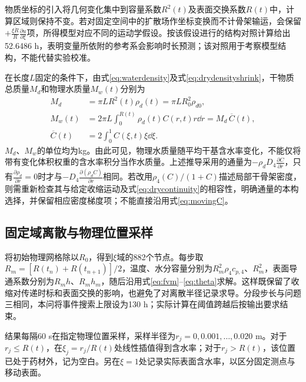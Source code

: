 物质坐标的引入将几何变化集中到容量系数$R^2(t)$及表面交换系数$R(t)$中，计算区域则保持不变。若对固定空间中的扩散场作坐标变换而不计骨架输运，会保留$+\frac{\xi\dot R}{R}\frac{\partial u}{\partial\xi}$项，所得模型对应不同的运动学假设。按该假设进行的结构对照计算给出52.6486 h，表明变量所依附的参考系会影响时长预测；该对照用于考察模型结构，不能代替实验校准。

在长度$L$固定的条件下，由式\eqref{eq:waterdensity}及式\eqref{eq:drydensityshrink}，干物质总质量$M_d$和物理水质量$M_w(t)$分别为
\begin{equation}
\begin{aligned}
M_d&=\pi LR^2(t)\rho_d(t)=\pi LR_0^2\rho_{d0},\\
M_w(t)&=2\pi L\int_0^{R(t)}\rho_d(t)C(r,t)r\dd r
=M_d\,\overline C(t),\\
\overline C(t)&=2\int_0^1C(\xi,t)\xi\dd\xi.
\end{aligned}
\label{eq:physicalwatermass}
\end{equation}
$M_d$、$M_w$的单位均为kg。由此可见，物理水质量随平均干基含水率变化，不能仅将带有变化体积权重的含水率积分当作水质量。上述推导采用的通量为$-\rho_dD_4\frac{\partial C}{\partial r}$，只有$\frac{\partial\rho_d}{\partial r}=0$时才与$-D_4\frac{\partial(\rho_dC)}{\partial r}$相同。若改用$\rho_4(C)/(1+C)$描述局部干骨架密度，则需重新检查其与给定收缩运动及式\eqref{eq:drycontinuity}的相容性，明确通量的本构选择，并保留相应密度梯度项；不能直接沿用式\eqref{eq:movingC}。

\subsection{固定域离散与物理位置采样}
将初始物理网格除以$R_0$，得到$\xi$域的882个节点。每步取$R_m=[R(t_n)+R(t_{n+1})]/2$，温度、水分容量分别为$R_m^2\rho_4c_{p,4}$、$R_m^2$，表面导通系数分别为$R_mh$、$R_mh_m$，随后沿用式\eqref{eq:fvm}--\eqref{eq:theta}求解。这样既保留了收缩对传递时标和表面交换的影响，也避免了对离散半径记录求导。分段步长与问题三相同，本问将事件搜索上限设为130 h；实际计算在阈值跨越后按输出要求结束。

结果每隔60 s在指定物理位置采样，采样半径为$r_j=0,0.001,\ldots,0.020$ m。对于$r_j\le R(t)$，在$\xi_j=r_j/R(t)$处线性插值得到含水率；对于$r_j>R(t)$，该位置已处于药材外，记为空白。另在$\xi=1$处记录实际表面含水率，以区分固定测点与移动表面。


